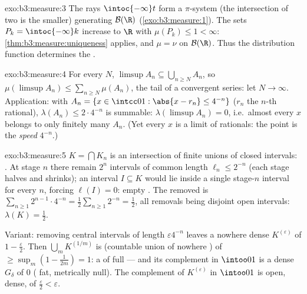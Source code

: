 \begin{solution}{exo:b3:measure:3}
The rays $\intoc{-\infty}t$ form a $\pi$-system (the
intersection of two is the smaller) generating $\mathcal B(\R)$
(\cref{exo:b3:measure:1}). The sets $P_k = \intoc{-\infty}k$
increase to $\R$ with $\mu(P_k) \leq 1 < \infty$:
\cref{thm:b3:measure:uniqueness} applies, and $\mu = \nu$ on
$\mathcal B(\R)$. Thus the distribution function determines the
.
\end{solution}

\begin{solution}{exo:b3:measure:4}
For every $N$, $\limsup A_n \subseteq \bigcup_{n \geq N}A_n$,
so $\mu(\limsup A_n) \leq \sum_{n\geq N}\mu(A_n)$, the tail of
a convergent series: let $N \to \infty$. Application: with
$A_n = \{x \in \intcc01 : \abs{x - r_n} \leq 4^{-n}\}$
($r_n$ the $n$-th rational), $\lambda(A_n) \leq 2\cdot4^{-n}$
is summable: $\lambda(\limsup A_n) = 0$, i.e.\ almost every $x$
belongs to only finitely many $A_n$. (Yet every $x$ is a limit
of rationals: the point is the \emph{speed} $4^{-n}$.)
\end{solution}

\begin{solution}{exo:b3:measure:5}
$K = \bigcap K_n$ is an intersection of finite unions of closed
intervals: . At stage $n$ there remain $2^n$ intervals
of common length $\ell_n \leq 2^{-n}$ (each stage halves and
shrinks); an interval $I \subseteq K$ would lie inside a single
stage-$n$ interval for every $n$, forcing $\ell(I) = 0$: empty
. The  removed is $\sum_{n\geq1}2^{n-1}\cdot
4^{-n} = \frac12\sum_{n\geq1}2^{-n} = \frac12$, all removals
being disjoint open intervals: $\lambda(K) = \frac12$.

Variant: removing central intervals of length $\varepsilon
4^{-n}$ leaves a nowhere dense  $K^{(\varepsilon)}$ of
 $1 - \frac\varepsilon2$. Then $\bigcup_m
K^{(1/m)}$ is  (countable union of nowhere )
of  $\geq \sup_m(1 - \frac1{2m}) = 1$: a  of
full  --- and its complement in $\intoo01$ is a dense
$G_\delta$ of  $0$ ( fat, metrically
null). The complement of $K^{(\varepsilon)}$ in $\intoo01$ is
open, dense, of  $\frac\varepsilon2 < \varepsilon$.
\end{solution}

